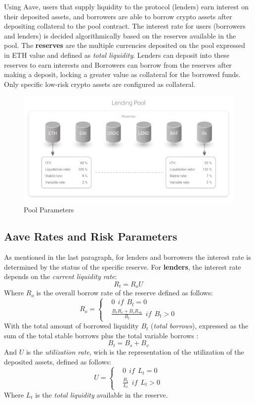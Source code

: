 \documentclass[11pt,a4paper]{report}
\begin{document}
Using Aave, users that supply liquidity to the protocol (lenders) earn interest on their deposited assets, and borrowers are able to borrow crypto assets after depositing collateral to the pool contract. The interest rate for users (borrowers and lenders) is decided algorithmically based on the reserves available in the pool. The \textbf{reserves} are the multiple currencies deposited on the pool expressed in ETH value and defined as \textit{total liquidity}. Lenders can deposit into these reserves to earn interests and Borrowers can borrow from the reserves after making a deposit, locking a greater value as collateral for the borrowed funds. Only specific low-risk crypto assets are configured as collateral. 
\begin{figure}[htp]
	\centering
	\includegraphics[width=1\textwidth]{./images/lp_reserves}
	\caption{Pool Parameters\cite{aaveV1}}
	\label{fig:tvl}
\end{figure}
\subsection{Aave Rates and Risk Parameters}
 As mentioned in the last paragraph, for lenders and borrowers the interest rate is determined by the status of the specific reserve. For \textbf{lenders}, the interest rate depends on  the \textit{current liquidity rate}:
\[ R_{t} = R_{o}U \]
Where $ R_{o} $ is the overall borrow rate of the reserve defined as follows:
\begin{equation}
	R_{o} = 
	\left\{\begin{matrix}
		&  0~~if~~B_{t}=0\\ 
		& \frac{B_{v}R_{v}+ B_{s}R_{sa}}{B_{t}}~~if~~B_{t} > 0
	\end{matrix}\right.
\end{equation}
With the total amount of borrowed liquidity $B_{t} $ (\textit{total borrows}), expressed as the sum of the total stable borrows plus  the total variable borrows :
\[ B_{t} = B_{s}+B_{v} \]
And $ U $ is the \textit{utilization rate}, wich is the representation of the utilization of the deposited assets, defined as follows:
\begin{equation}
	U = 
	\left\{\begin{matrix}
		&  0~~if~~L_{t}=0\\ 
		& \frac{B_{t}}{L_{t}}~~if~~L_{t} > 0
	\end{matrix}\right.
\end{equation}
Where $L_{t}$  is the \textit{total liquidity} available in the reserve.
\end{document}
